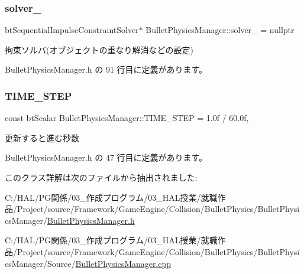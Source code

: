 \subsubsection{\texorpdfstring{solver\+\_\+}{solver\_}}
{\footnotesize\ttfamily bt\+Sequential\+Impulse\+Constraint\+Solver$\ast$ Bullet\+Physics\+Manager\+::solver\+\_\+ = nullptr\hspace{0.3cm}{\ttfamily [private]}}



拘束ソルバ(オブジェクトの重なり解消などの設定) 



 Bullet\+Physics\+Manager.\+h の 91 行目に定義があります。

\mbox{\label{class_bullet_physics_manager_a77df988ab75c091f8d56b8ffb41e9012}} 
\subsubsection{\texorpdfstring{T\+I\+M\+E\+\_\+\+S\+T\+EP}{TIME\_STEP}}
{\footnotesize\ttfamily const bt\+Scalar Bullet\+Physics\+Manager\+::\+T\+I\+M\+E\+\_\+\+S\+T\+EP = 1.\+0f / 60.\+0f\hspace{0.3cm}{\ttfamily [static]}, {\ttfamily [private]}}



更新すると進む秒数 



 Bullet\+Physics\+Manager.\+h の 47 行目に定義があります。



このクラス詳解は次のファイルから抽出されました\+:\begin{DoxyCompactItemize}
\item 
C\+:/\+H\+A\+L/\+P\+G関係/03\+\_\+作成プログラム/03\+\_\+\+H\+A\+L授業/就職作品/\+Project/source/\+Framework/\+Game\+Engine/\+Collision/\+Bullet\+Physics/\+Bullet\+Physics\+Manager/\mbox{\hyperlink{_bullet_physics_manager_8h}{Bullet\+Physics\+Manager.\+h}}\item 
C\+:/\+H\+A\+L/\+P\+G関係/03\+\_\+作成プログラム/03\+\_\+\+H\+A\+L授業/就職作品/\+Project/source/\+Framework/\+Game\+Engine/\+Collision/\+Bullet\+Physics/\+Bullet\+Physics\+Manager/\+Source/\mbox{\hyperlink{_bullet_physics_manager_8cpp}{Bullet\+Physics\+Manager.\+cpp}}\end{DoxyCompactItemize}
